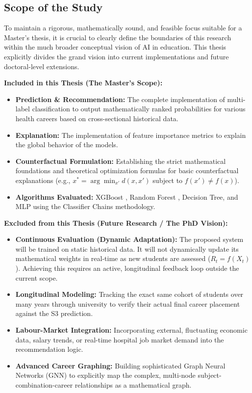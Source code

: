\subsection{Scope of the Study}

To maintain a rigorous, mathematically sound, and feasible focus suitable for a Master's thesis, it is crucial to clearly define the boundaries of this research within the much broader conceptual vision of AI in education. This thesis explicitly divides the grand vision into current implementations and future doctoral-level extensions.

\textbf{Included in this Thesis (The Master's Scope):}
\begin{itemize}
    \item \textbf{Prediction \& Recommendation:} The complete implementation of multi-label \parencite{tsoumakas2007multi} classification to output mathematically ranked probabilities for various health careers based on cross-sectional historical data.
    \item \textbf{Explanation:} The implementation of feature importance metrics to explain the global behavior of the models.
    \item \textbf{Counterfactual Formulation:} Establishing the strict mathematical foundations and theoretical optimization formulas for basic counterfactual \parencite{wachter2017counterfactual} explanations (e.g., $x^* = \arg\min_{x'} d(x,x')$ subject to $f(x') \neq f(x)$).
    \item \textbf{Algorithms Evaluated:} XGBoost \parencite{chen2016xgboost}, Random Forest \parencite{breiman2001random}, Decision Tree, and MLP using the Classifier Chains \parencite{read2011classifier} methodology.
\end{itemize}

\textbf{Excluded from this Thesis (Future Research / The PhD Vision):}
\begin{itemize}
    \item \textbf{Continuous Evaluation (Dynamic Adaptation):} The proposed system will be trained on static historical data. It will not dynamically update its mathematical weights in real-time as new students are assessed ($R_t = f(X_t)$). Achieving this requires an active, longitudinal feedback loop outside the current scope.
    \item \textbf{Longitudinal Modeling:} Tracking the exact same cohort of students over many years through university to verify their actual final career placement against the S3 prediction.
    \item \textbf{Labour-Market Integration:} Incorporating external, fluctuating economic data, salary trends, or real-time hospital job market demand into the recommendation logic.
    \item \textbf{Advanced Career Graphing:} Building sophisticated Graph Neural Networks (GNN) to explicitly map the complex, multi-node subject-combination-career relationships as a mathematical graph.
\end{itemize}

